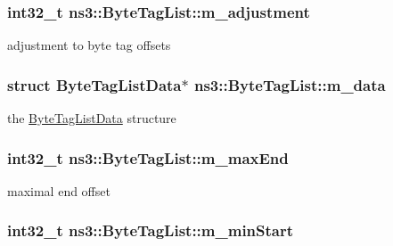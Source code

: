 \subsubsection[{\texorpdfstring{m\+\_\+adjustment}{m_adjustment}}]{\setlength{\rightskip}{0pt plus 5cm}int32\+\_\+t ns3\+::\+Byte\+Tag\+List\+::m\+\_\+adjustment\hspace{0.3cm}{\ttfamily [private]}}\hypertarget{classns3_1_1ByteTagList_ab8fc894533bb31b08e75f480f3a284f4}{}\label{classns3_1_1ByteTagList_ab8fc894533bb31b08e75f480f3a284f4}


adjustment to byte tag offsets 

\subsubsection[{\texorpdfstring{m\+\_\+data}{m_data}}]{\setlength{\rightskip}{0pt plus 5cm}struct {\bf Byte\+Tag\+List\+Data}$\ast$ ns3\+::\+Byte\+Tag\+List\+::m\+\_\+data\hspace{0.3cm}{\ttfamily [private]}}\hypertarget{classns3_1_1ByteTagList_a716851dd71c2fdbf13e4372bf61cde13}{}\label{classns3_1_1ByteTagList_a716851dd71c2fdbf13e4372bf61cde13}


the \hyperlink{structns3_1_1ByteTagListData}{Byte\+Tag\+List\+Data} structure 

\subsubsection[{\texorpdfstring{m\+\_\+max\+End}{m_maxEnd}}]{\setlength{\rightskip}{0pt plus 5cm}int32\+\_\+t ns3\+::\+Byte\+Tag\+List\+::m\+\_\+max\+End\hspace{0.3cm}{\ttfamily [private]}}\hypertarget{classns3_1_1ByteTagList_ad4387364f261f32cc6bad94bfcee327c}{}\label{classns3_1_1ByteTagList_ad4387364f261f32cc6bad94bfcee327c}


maximal end offset 

\subsubsection[{\texorpdfstring{m\+\_\+min\+Start}{m_minStart}}]{\setlength{\rightskip}{0pt plus 5cm}int32\+\_\+t ns3\+::\+Byte\+Tag\+List\+::m\+\_\+min\+Start\hspace{0.3cm}{\ttfamily [private]}}\hypertarget{classns3_1_1ByteTagList_a24017961aabc3bcd82344489dbeefcc3}{}\label{classns3_1_1ByteTagList_a24017961aabc3bcd82344489dbeefcc3}


